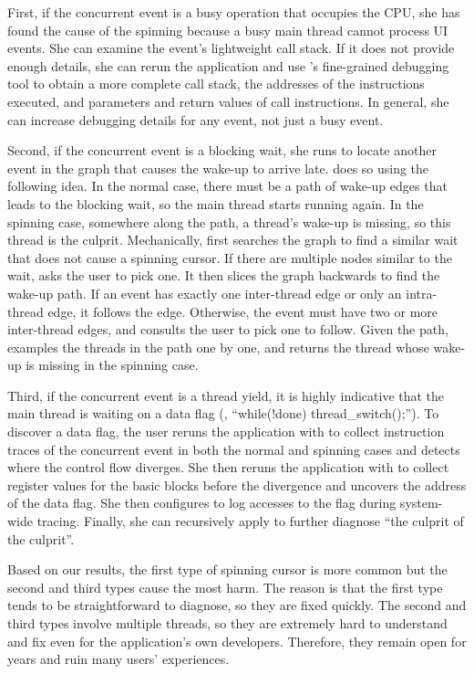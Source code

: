 First, if the concurrent event is a busy operation that occupies the CPU,
she has found the cause of the spinning because a busy main thread cannot
process UI events.  She can examine the event's lightweight call stack.
If it does not provide enough details, she can rerun the application and
use \xxx's fine-grained debugging tool to obtain a more complete call
stack, the addresses of the instructions executed, and parameters and
return values of call instructions.  In general, she can increase
debugging details for any event, not just a busy event.

Second, if the concurrent event is a blocking wait, she runs \xxx to
locate another event in the graph that causes the wake-up to arrive
late. \xxx does so using the following idea.  In the normal case, there
must be a path of wake-up edges that leads to the blocking wait, so the
main thread starts running again.  In the spinning case, somewhere along
the path, a thread's wake-up is missing, so this thread is the culprit.
Mechanically, \xxx first searches the graph to find a similar wait that
does not cause a spinning cursor.  If there are multiple nodes similar to
the wait, \xxx asks the user to pick one.  It then slices the graph
backwards to find the wake-up path.  If an event has exactly one
inter-thread edge or only an intra-thread edge, it follows the edge.
Otherwise, the event must have two or more inter-thread edges, and \xxx
consults the user to pick one to follow.  Given the path, \xxx examples
the threads in the path one by one, and returns the thread whose wake-up
is missing in the spinning case.

Third, if the concurrent event is a thread yield, it is highly indicative that
the main thread is waiting on a data flag (\eg, ``while(!done)
thread\_switch();'').  To discover a data flag, the user reruns the application
with \xxx to collect instruction traces of the concurrent event in both the
normal and spinning cases and detects where the control flow diverges.  She
then reruns the application with \xxx to collect register values for the basic
blocks before the divergence and uncovers the address of the data flag.  She
then configures \xxx to log accesses to the flag during system-wide
tracing. Finally, she can recursively apply \xxx to further diagnose ``the
culprit of the culprit''. 

Based on our results, the first type of spinning cursor is more common but
the second and third types cause the most harm.  The reason is that the
first type tends to be straightforward to diagnose, so they are fixed
quickly.  The second and third types involve multiple threads, so they are
extremely hard to understand and fix even for the application's own
developers.  Therefore, they remain open for years and ruin many users'
experiences.


